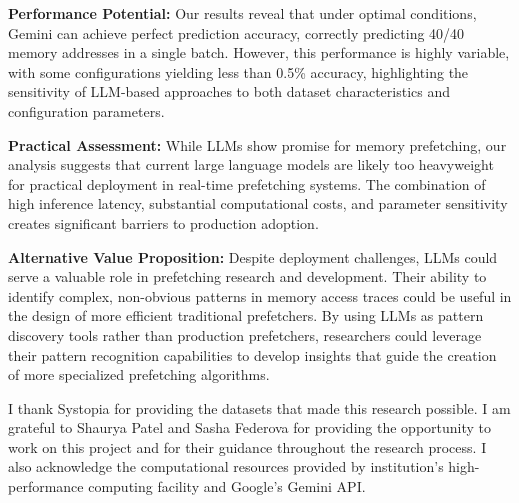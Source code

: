 \documentclass[sigconf,authorversion,nonacm]{acmart}
\begin{document}
\textbf{Performance Potential:} Our results reveal that under optimal conditions, Gemini can achieve perfect prediction accuracy, correctly predicting 40/40 memory addresses in a single batch. However, this performance is highly variable, with some configurations yielding less than 0.5\% accuracy, highlighting the sensitivity of LLM-based approaches to both dataset characteristics and configuration parameters.

\textbf{Practical Assessment:} While LLMs show promise for memory prefetching, our analysis suggests that current large language models are likely too heavyweight for practical deployment in real-time prefetching systems. The combination of high inference latency, substantial computational costs, and parameter sensitivity creates significant barriers to production adoption.

\textbf{Alternative Value Proposition:} Despite deployment challenges, LLMs could serve a valuable role in prefetching research and development. Their ability to identify complex, non-obvious patterns in memory access traces could be useful in the design of more efficient traditional prefetchers. By using LLMs as pattern discovery tools rather than production prefetchers, researchers could leverage their pattern recognition capabilities to develop insights that guide the creation of more specialized prefetching algorithms.



\begin{acks}
I thank Systopia for providing the datasets that made this research possible. I am grateful to Shaurya Patel and Sasha Federova for providing the opportunity to work on this project and for their guidance throughout the research process. I also acknowledge the computational resources provided by institution's high-performance computing facility and Google's Gemini API.
\end{acks}



\end{document}
